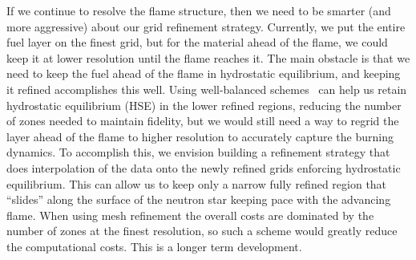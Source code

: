 \documentclass[a4paper]{jpconf}
\begin{document}
If we continue to resolve the flame structure, then we need to be
smarter (and more aggressive) about our grid refinement strategy.
Currently, we put the entire fuel layer on the finest grid, but for
the material ahead of the flame, we could keep it at lower resolution
until the flame reaches it.  The main obstacle is that we need to keep
the fuel ahead of the flame in hydrostatic equilibrium, and keeping it
refined accomplishes this well.  Using well-balanced
schemes~\cite{kappeli:2016} can help us retain hydrostatic equilibrium
(HSE) in the lower refined regions, reducing the number of zones
needed to maintain fidelity, but we would still need a way to regrid
the layer ahead of the flame to higher resolution to accurately
capture the burning dynamics.  To accomplish this, we envision
building a refinement strategy that does interpolation of the data onto
the newly refined grids enforcing hydrostatic equilibrium.  This can
allow us to keep only a narrow fully refined region that ``slides''
along the surface of the neutron star keeping pace with the advancing
flame.  When using mesh refinement the overall costs are dominated by the
number of zones at the finest resolution, so such a scheme would greatly reduce
the computational costs. This is a longer term development.
\end{document}
